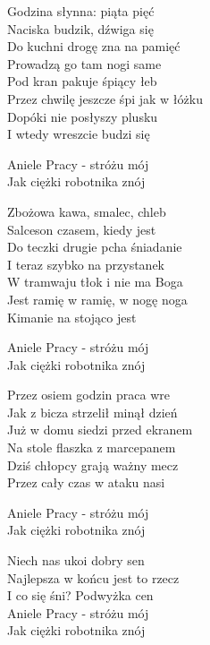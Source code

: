 \begin{text}
    Godzina słynna: piąta pięć\\
    Naciska budzik, dźwiga się\\
    Do kuchni drogę zna na pamięć\\
    Prowadzą go tam nogi same\\
    Pod kran pakuje śpiący łeb\\
    Przez chwilę jeszcze śpi jak w łóżku\\
    Dopóki nie posłyszy plusku\\
    I wtedy wreszcie budzi się

    Aniele Pracy - stróżu mój\\
    Jak ciężki robotnika znój

    Zbożowa kawa, smalec, chleb\\
    Salceson czasem, kiedy jest\\
    Do teczki drugie pcha śniadanie\\
    I teraz szybko na przystanek\\
    W tramwaju tłok i nie ma Boga\\
    Jest ramię w ramię, w nogę noga\\
    Kimanie na stojąco jest

    Aniele Pracy - stróżu mój\\
    Jak ciężki robotnika znój

    Przez osiem godzin praca wre\\
    Jak z bicza strzelił minął dzień\\
    Już w domu siedzi przed ekranem\\
    Na stole flaszka z marcepanem\\
    Dziś chłopcy grają ważny mecz\\
    Przez cały czas w ataku nasi

    Aniele Pracy - stróżu mój\\
    Jak ciężki robotnika znój

    Niech nas ukoi dobry sen\\
    Najlepsza w końcu jest to rzecz\\
    I co się śni? Podwyżka cen\\
    Aniele Pracy - stróżu mój\\
    Jak ciężki robotnika znój
\end{text}
\begin{chord}

\end{chord}